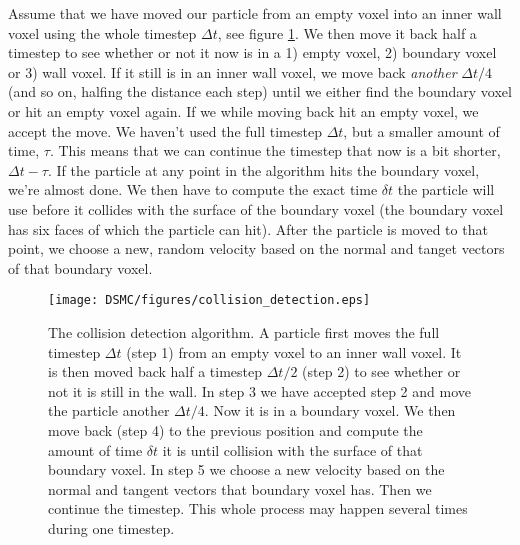 Assume that we have moved our particle from an empty voxel into an inner wall voxel using the whole timestep $\Delta t$, see figure \ref{fig:dsmc_collision_detection}. We then move it back half a timestep to see whether or not it now is in a 1) empty voxel, 2) boundary voxel or 3) wall voxel. If it still is in an inner wall voxel, we move back \textit{another} $\Delta t/4$ (and so on, halfing the distance each step) until we either find the boundary voxel or hit an empty voxel again. If we while moving back hit an empty voxel, we accept the move. We haven't used the full timestep $\Delta t$, but a smaller amount of time, $\tau$. This means that we can continue the timestep that now is a bit shorter, $\Delta t - \tau$. If the particle at any point in the algorithm hits the boundary voxel, we're almost done. We then have to compute the exact time $\delta t$ the particle will use before it collides with the surface of the boundary voxel (the boundary voxel has six faces of which the particle can hit). After the particle is moved to that point, we choose a new, random velocity based on the normal and tanget vectors of that boundary voxel.
\newpage
\begin{figure}[htb]
\begin{center}
\texttt{[image: DSMC/figures/collision\_detection.eps]}
\end{center}
\caption{The collision detection algorithm. A particle first moves the full timestep $\Delta t$ (step 1) from an empty voxel to an inner wall voxel. It is then moved back half a timestep  $\Delta t/2$ (step 2) to see whether or not it is still in the wall. In step 3 we have accepted step 2 and move the particle another $\Delta t/4$. Now it is in a boundary voxel. We then move back (step 4) to the previous position and compute the amount of time $\delta t$ it is until collision with the surface of that boundary voxel. In step 5 we choose a new velocity based on the normal and tangent vectors that boundary voxel has. Then we continue the timestep. This whole process may happen several times during one timestep.}
\label{fig:dsmc_collision_detection}
\end{figure}

